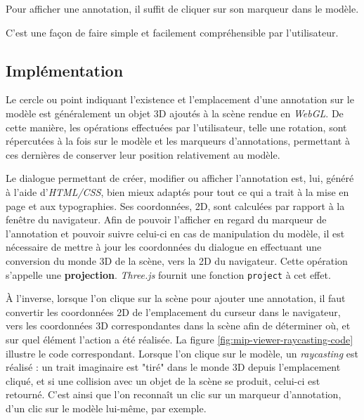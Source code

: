 Pour afficher une annotation, il suffit de cliquer sur son marqueur dans le modèle.

C'est une façon de faire simple et facilement compréhensible par l'utilisateur.

\subsection{Implémentation}

Le cercle ou point indiquant l'existence et l'emplacement d'une annotation sur le modèle est généralement un objet 3D ajoutés à la scène rendue en \textit{WebGL}. De cette manière, les opérations effectuées par l'utilisateur, telle une rotation, sont répercutées à la fois sur le modèle et les marqueurs d'annotations, permettant à ces dernières de conserver leur position relativement au modèle.

Le dialogue permettant de créer, modifier ou afficher l'annotation est, lui, généré à l'aide d'\textit{HTML/CSS}, bien mieux adaptés pour tout ce qui a trait à la mise en page et aux typographies. Ses coordonnées, 2D, sont calculées par rapport à la fenêtre du navigateur. Afin de pouvoir l'afficher en regard du marqueur de l'annotation et pouvoir suivre celui-ci en cas de manipulation du modèle, il est nécessaire de mettre à jour les coordonnées du dialogue en effectuant une conversion du monde 3D de la scène, vers la 2D du navigateur. Cette opération s'appelle une \textbf{projection}. \textit{Three.js} fournit une fonction \texttt{project} à cet effet.

À l'inverse, lorsque l'on clique sur la scène pour ajouter une annotation, il faut convertir les coordonnées 2D de l'emplacement du curseur dans le navigateur, vers les coordonnées 3D correspondantes dans la scène afin de déterminer où, et sur quel élément l'action a été réalisée.
La figure \ref{fig:mip-viewer-raycasting-code} illustre le code correspondant. Lorsque l'on clique sur le modèle, un \textit{raycasting} est réalisé : un trait imaginaire est "tiré" dans le monde 3D depuis l'emplacement cliqué, et si une collision avec un objet de la scène se produit, celui-ci est retourné. C'est ainsi que l'on reconnaît un clic sur un marqueur d'annotation, d'un clic sur le modèle lui-même, par exemple.

